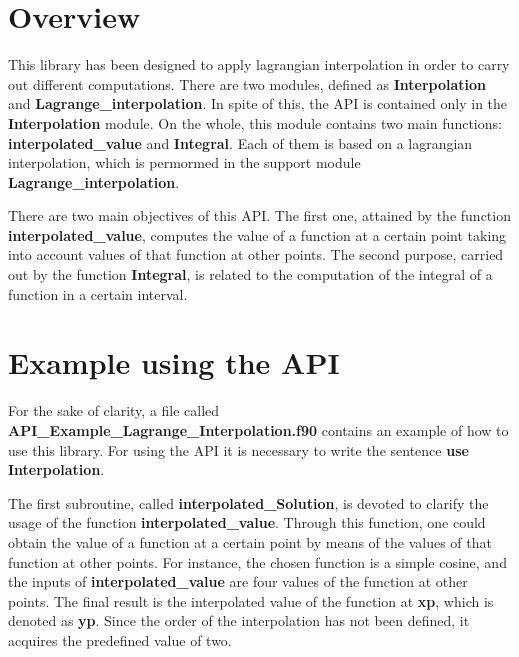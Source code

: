 


\section{Overview}

This library has been designed to apply lagrangian interpolation in order to carry out different computations. There are two modules, defined as \textbf{Interpolation} and \textbf{Lagrange\_interpolation}. In spite of this, the API is contained only in the \textbf{Interpolation} module. On the whole, this module contains two main functions: \textbf{interpolated\_value} and \textbf{Integral}. Each of them is based on a lagrangian interpolation, which is permormed in the support module \textbf{Lagrange\_interpolation}. 

There are two main objectives of this API. The first one, attained by the function \textbf{interpolated\_value}, computes the value of a function at a certain point taking into account values of that function at other points. The second purpose, carried out by the function \textbf{Integral}, is related to the computation of the integral of a function in a certain interval.

\section{Example using the API}

For the sake of clarity, a file called \textbf{API\_Example\_Lagrange\_Interpolation.f90} contains an example of how to use this library. For using the API it is necessary to write the sentence \textbf{use Interpolation}.

The first subroutine, called \textbf{interpolated\_Solution}, is devoted to clarify the usage of the function \textbf{interpolated\_value}. Through this function, one could obtain the value of a function at a certain point by means of the values of that function at other points. For instance, the chosen function is a simple cosine, and the inputs of \textbf{interpolated\_value} are four values of the function at other points. The final result is the interpolated value of the function at \textbf{xp}, which is denoted as \textbf{yp}. Since the order of the interpolation has not been defined, it acquires the predefined value of two. 

